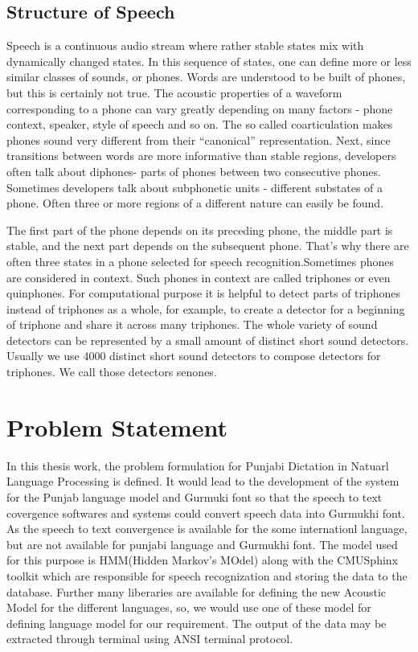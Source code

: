 \documentclass[12pt,a4paper,oldfontcommands]{memoir}
\begin{document}
\subsection{Structure of Speech}
Speech is a continuous audio stream where rather stable states mix with dynamically changed states. In this sequence of states, one can define more or less similar classes of sounds, or phones. Words are understood to be built of phones, but this is certainly not true. The acoustic properties of a waveform corresponding to a phone can vary greatly depending on many factors - phone context, speaker, style of speech and so on. The so called coarticulation makes phones sound very different from their “canonical” representation. Next, since transitions between words are more informative than stable regions, developers often talk about diphones- parts of phones between two consecutive phones. Sometimes developers talk about subphonetic units - different substates of a phone. Often three or more regions of a different nature can easily be found\cite{2}.

The first part of the phone depends on its preceding phone, the middle part is stable, and the next part depends on the subsequent phone. That's why there are often three states in a phone selected for speech recognition.Sometimes phones are considered in context. Such phones in context are called triphones or even quinphones. For computational purpose it is helpful to detect parts of triphones instead of triphones as a whole, for example, to create a detector for a beginning of triphone and share it across many triphones. The whole variety of sound detectors can be represented by a small amount of distinct short sound detectors. Usually we use 4000 distinct short sound detectors to compose detectors for triphones. We call those detectors senones. 

\section{ Problem Statement}

In this thesis work, the problem formulation for Punjabi Dictation in Natuarl Language Processing is defined. It would lead to the development of the system for the Punjab language model and Gurmuki font so that the speech to text covergence softwares and systems could convert speech data into Gurmukhi font. As the speech to text convergence is available for the some internationl language, but are not available for punjabi language and Gurmukhi font. The model used for this purpose is HMM(Hidden Markov’s MOdel) along with the CMUSphinx toolkit which are responsible for speech recognization and storing the data to the database. Further many liberaries are available for defining the new Acoustic Model for the different languages, so, we would use one of these model for defining language model for our requirement. The output of the data may be extracted through terminal using ANSI terminal protocol\cite{3}.
\end{document}
